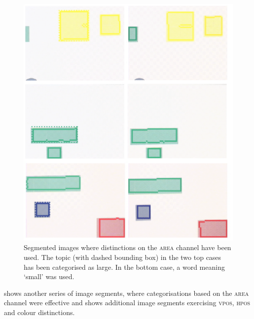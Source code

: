 \begin{figure}
\begin{center}
\includegraphics[width=0.8\columnwidth]{chap7/figs/plate-14-area.pdf}
\end{center}
\caption{Segmented images where distinctions on the \textsc{area} channel have been used. The topic (with dashed bounding 
box) in the two top cases has been categorised as large. In the bottom case, a word meaning `small' was used.}
\label{fig:plate-14}
\end{figure}

 shows another series of image segments, 
where categorisations based on the \textsc{area} channel were effective
and  shows additional image segments exercising
\textsc{vpos}, \textsc{hpos} and colour distinctions. 

